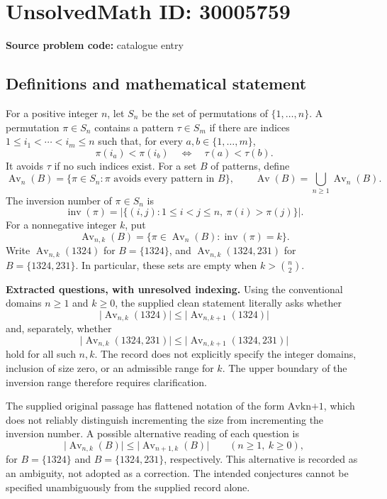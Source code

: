 \documentclass[11pt]{article}
\begin{document}
\section*{UnsolvedMath ID: 30005759}
\textbf{Source problem code:} catalogue entry
\subsection{Definitions and mathematical statement}
For a positive integer \(n\), let \(S_n\) be the set of permutations of \(\{1,\ldots,n\}\). A permutation \(\pi\in S_n\) contains a pattern \(\tau\in S_m\) if there are indices \(1\le i_1<\cdots<i_m\le n\) such that, for every \(a,b\in\{1,\ldots,m\}\),
\[
\pi(i_a)<\pi(i_b)\quad\Longleftrightarrow\quad\tau(a)<\tau(b).
\]
It avoids \(\tau\) if no such indices exist. For a set \(B\) of patterns, define
\[
\operatorname{Av}_n(B)=\{\pi\in S_n:\pi\text{ avoids every pattern in }B\},
\qquad
\operatorname{Av}(B)=\bigcup_{n\ge1}\operatorname{Av}_n(B).
\]
The inversion number of \(\pi\in S_n\) is
\[
\operatorname{inv}(\pi)=\bigl|\{(i,j):1\le i<j\le n,\ \pi(i)>\pi(j)\}\bigr|.
\]
For a nonnegative integer \(k\), put
\[
\operatorname{Av}_{n,k}(B)=\{\pi\in\operatorname{Av}_n(B):\operatorname{inv}(\pi)=k\}.
\]
Write \(\operatorname{Av}_{n,k}(1324)\) for \(B=\{1324\}\), and \(\operatorname{Av}_{n,k}(1324,231)\) for \(B=\{1324,231\}\). In particular, these sets are empty when \(k>\binom n2\).

\textbf{Extracted questions, with unresolved indexing.} Using the conventional domains \(n\ge1\) and \(k\ge0\), the supplied clean statement literally asks whether
\[
\bigl|\operatorname{Av}_{n,k}(1324)\bigr|
\le
\bigl|\operatorname{Av}_{n,k+1}(1324)\bigr|
\]
and, separately, whether
\[
\bigl|\operatorname{Av}_{n,k}(1324,231)\bigr|
\le
\bigl|\operatorname{Av}_{n,k+1}(1324,231)\bigr|
\]
hold for all such \(n,k\). The record does not explicitly specify the integer domains, inclusion of size zero, or an admissible range for \(k\). The upper boundary of the inversion range therefore requires clarification.

The supplied original passage has flattened notation of the form \(\text{Avkn+1}\), which does not reliably distinguish incrementing the size from incrementing the inversion number. A possible alternative reading of each question is
\[
\bigl|\operatorname{Av}_{n,k}(B)\bigr|
\le
\bigl|\operatorname{Av}_{n+1,k}(B)\bigr|
\qquad(n\ge1,\ k\ge0),
\]
for \(B=\{1324\}\) and \(B=\{1324,231\}\), respectively. This alternative is recorded as an ambiguity, not adopted as a correction. The intended conjectures cannot be specified unambiguously from the supplied record alone.
\end{document}
